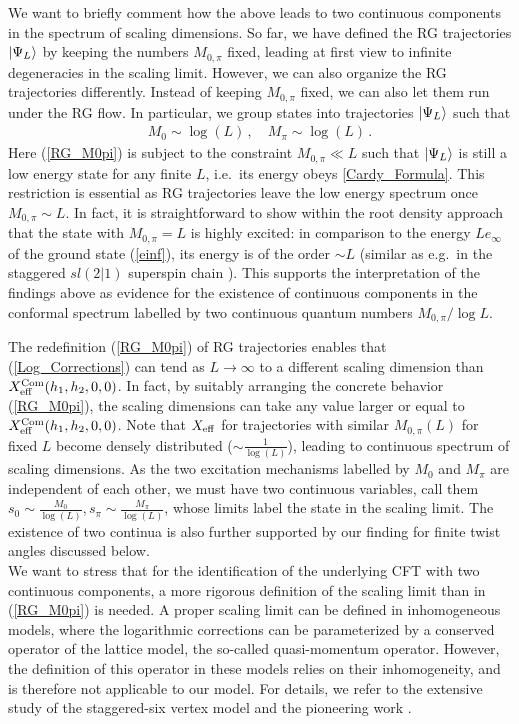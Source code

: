 \documentclass[12pt]{article}
\numberwithin{equation}{section}
\begin{document}
We want to briefly comment how the above leads to two continuous components in the spectrum of scaling dimensions. So far, we have defined the RG trajectories $\ket{\Psi_L}$ by keeping the numbers $M_{0,\pi}$ fixed, leading at first view to infinite degeneracies in the scaling limit. 
However, we can also organize the RG trajectories differently. Instead of keeping $M_{0,\pi}$ fixed, we can also let them run under the RG flow. In particular, we group states into trajectories $\ket{\Psi_L}$ such that 
\begin{align}
    M_{0}\sim \log(L)\,, \quad M_{\pi}\sim \log(L) \label{RG_M0pi}\,.
\end{align}
Here (\ref{RG_M0pi}) is subject to the constraint $M_{0,\pi}\ll L$ such that $\ket{\Psi_L}$ is still a low energy state for any finite $L$, i.e.\ its energy obeys  \eqref{Cardy_Formula}. This restriction is essential as RG trajectories leave the low energy spectrum once $M_{0,\pi}\sim L$.  In fact, it is straightforward to show within the root density approach that the state with $M_{0,\pi}=L$ is highly excited: in comparison to the energy $L e_\infty$ of the ground state (\ref{einf}), its energy is of the order $\sim L$ (similar as e.g.\ in the staggered $sl(2|1)$ superspin chain \cite{EsFS05}).  This supports the interpretation of the findings above as evidence for the existence of continuous components in the conformal spectrum labelled by two continuous quantum numbers $M_{0,\pi}/\log L$. 

The redefinition (\ref{RG_M0pi}) of RG trajectories enables that (\ref{Log_Corrections}) can tend as $L\to \infty$ to a different scaling dimension than $X^{\rm{Com}}_{\rm{eff}}(h_1,h_2,0,0)$. In fact, by suitably arranging the concrete behavior (\ref{RG_M0pi}), the scaling dimensions can take any value larger or equal to $X^{\rm{Com}}_{\rm{eff}}(h_1,h_2,0,0)$. Note that $X_{\rm{eff}}$ for trajectories with similar $M_{0,\pi}(L)$ for fixed $L$ become densely distributed ($\sim \frac{1}{\log (L)}$), leading to continuous spectrum of scaling dimensions. As the two excitation mechanisms labelled by $M_{0}$ and $M_{\pi}$ are independent of each other, we must have two continuous variables, call them $s_0\sim \frac{M_0}{\log(L)} ,s_\pi\sim\frac{M_\pi}{\log(L)}$, whose limits label the state in the scaling limit. The existence of two continua is also further supported by our finding for finite twist angles discussed below.\\

We want to stress that for the identification of the underlying CFT with two continuous components, a more rigorous definition of the scaling limit than in (\ref{RG_M0pi}) is needed. A proper scaling limit can be defined in inhomogeneous models, where the logarithmic corrections can be parameterized by a conserved operator of the lattice model, the so-called quasi-momentum operator. However, the definition of this operator in these models relies on their inhomogeneity, and is therefore not applicable to our model. For details, we refer to the extensive study of the staggered-six vertex model \cite{BKKL21a,BKKL21b} and the pioneering work  \cite{IkJS12}.
\end{document}
